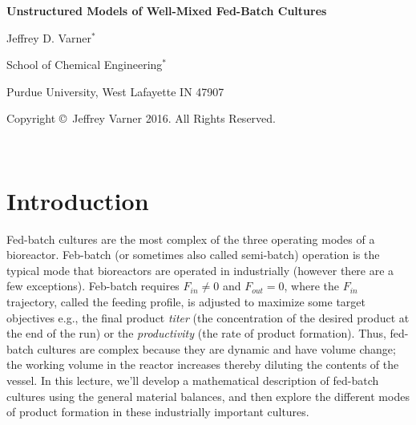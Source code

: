 \documentclass[11pt]{article}
\theoremstyle{definition}
\begin{document}
{\par\centering\textbf{\Large Unstructured Models of Well-Mixed Fed-Batch Cultures}}
\vspace{0.2in}
{\par \centering \large{Jeffrey D. Varner$^{*}$}}
\vspace{0.05in}
{\par \centering \large{School of Chemical Engineering$^{*}$}}
{\par \centering \large{Purdue University, West Lafayette IN 47907}}
\vspace{0.1in}
{\par \centering \small{Copyright \copyright\ Jeffrey Varner 2016. All Rights Reserved.}}\\

\date{}
\thispagestyle{empty}

\setcounter{page}{1}


\section*{Introduction}
Fed-batch cultures are the most complex of the three operating modes of a bioreactor.
Feb-batch (or sometimes also called semi-batch) operation is the typical mode that bioreactors are operated in industrially (however there are a few exceptions).
Feb-batch requires $F_{in}\neq{0}$ and $F_{out} = 0$, where the $F_{in}$ trajectory, called the feeding profile, is adjusted to maximize some target objectives e.g.,
the final product \emph{titer} (the concentration of the desired product at the end of the run) or the
\emph{productivity} (the rate of product formation). Thus, fed-batch cultures are complex because they are dynamic and have volume change;
the working volume in the reactor increases thereby diluting the contents of the vessel.
In this lecture, we'll develop a mathematical description of
fed-batch cultures using the general material balances, and then explore the different modes of product formation in these industrially important cultures.
\end{document}
